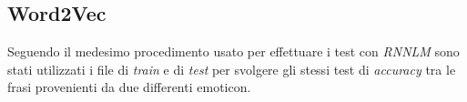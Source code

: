 \documentclass[a4paper,12pt,openright,twoside]{report}
\theoremstyle{definition}
\begin{document}

\subsection{Word2Vec}
\label{sss:word2vec}
Seguendo il medesimo procedimento usato per effettuare i test con \emph{RNNLM} 
sono stati utilizzati i file di \emph{train} e di \emph{test}
per svolgere gli stessi test di \emph{accuracy} tra le frasi provenienti da due differenti emoticon.
\end{document}
